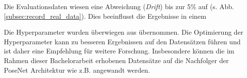 Die Evaluationsdaten wiesen eine Abweichung (\textit{Drift}) bis zur 5\% auf (s. Abb. \ref{subsec:record_real_data}). Dies beeinflusst die Ergebnisse in einem 
%






Die Hyperparameter wurden überwiegen aus \citet{acharyaBIMPoseNetIndoorCamera2019} übernommen. Die Optimierung der Hyperparameter kann zu besseren Ergebnissen auf den Datensätzen führen und ist daher eine Empfehlung für weitere Forschung. Insbesondere können die im Rahmen dieser Bachelorarbeit erhobenen Datensätze auf die Nachfolger der PoseNet Architektur wie z.B. \cite{kendallModellingUncertaintyDeep2016, walchImageBasedLocalizationUsing2017, kendallGeometricLossFunctions2017, clarkVidLocDeepSpatioTemporal2017} angewandt werden.


% 

